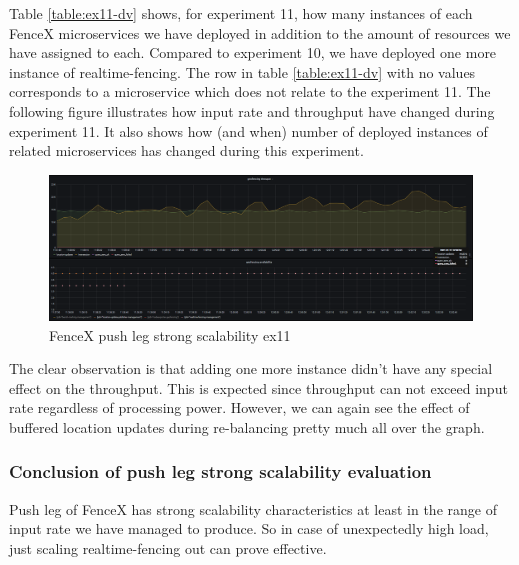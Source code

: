 \documentclass[a4]{report}
\begin{document}
    Table \ref{table:ex11-dv} shows, for experiment 11, how many instances of each FenceX microservices we have
    deployed in addition to the amount of resources we have assigned to each.
    Compared to experiment 10, we have deployed one more instance of realtime-fencing.
    The row in table \ref{table:ex11-dv} with no values corresponds to a microservice which does not relate to the
    experiment 11.
    The following figure illustrates how input rate and throughput have changed during experiment 11.
    It also shows how (and when) number of deployed instances of related microservices has changed during this
    experiment.

    \begin{figure}[h!]
        \centering
        \caption{FenceX push leg strong scalability ex11}
        \label{fig:ex11}
        \includegraphics[width=\linewidth, scale=2]{images/evaluation/ex11-benchmarking-ongoing-2per4sec.png}
    \end{figure}

    The clear observation is that adding one more instance didn't have any special effect on the throughput.
    This is expected since throughput can not exceed input rate regardless of processing power.
    However, we can again see the effect of buffered location updates during re-balancing pretty much all over the
    graph.

    \subsubsection{Conclusion of push leg strong scalability evaluation}
    Push leg of FenceX has strong scalability characteristics at least in the range of input rate we have managed to produce.
    So in case of unexpectedly high load, just scaling realtime-fencing out can prove effective.
\end{document}
